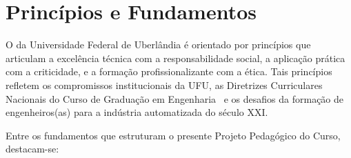 \chapter{Princípios e Fundamentos}
\label{chp:principios}

O \ppccurso da Universidade Federal de Uberlândia é orientado por princípios que articulam a excelência técnica com a responsabilidade social, a aplicação prática com a criticidade, e a formação profissionalizante com a ética. Tais princípios refletem os compromissos institucionais da UFU, as Diretrizes Curriculares Nacionais do Curso de Graduação em Engenharia~\cite{cne_ces_2_2019,cne_ces_1_2021} e os desafios da formação de engenheiros(as) para a indústria automatizada do século XXI.

Entre os fundamentos que estruturam o presente Projeto Pedagógico do Curso, destacam-se:

